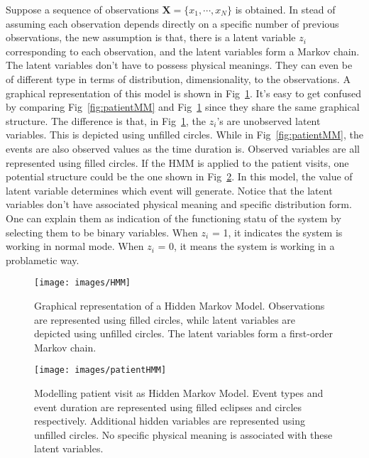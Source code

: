 Suppose a sequence of observations \(\mathbf{X} = \{x_1, \cdots, x_N\}\) is obtained. In stead of assuming each observation depends directly on a specific number of previous observations, the new assumption is that, there is a latent variable \(z_i\) corresponding to each observation, and the latent variables form a Markov chain. The latent variables don't have to possess physical meanings. They can even be of different type in terms of distribution, dimensionality, to the observations. A graphical representation of this model is shown in Fig~\ref{fig:HMM}. It's easy to get confused by comparing Fig~\ref{fig:patientMM} and Fig~\ref{fig:HMM} since they share the same graphical structure. The difference is that, in Fig~\ref{fig:HMM}, the \(z_i\)'s are unobserved latent variables. This is depicted using unfilled circles. While in Fig~\ref{fig:patientMM}, the events are also observed values as the time duration is. Observed variables are all represented using filled circles. If the HMM is applied to the patient visits, one potential structure could be the one shown in Fig~\ref{fig:patientHMM}. In this model, the value of latent variable determines which event will generate. Notice that the latent variables don't have associated physical meaning and specific distribution form. One can explain them as indication of the functioning statu of the system by selecting them to be binary variables. When \(z_i\) = 1, it indicates the system is working in normal mode. When \(z_i\) = 0, it means the system is working in a problametic way.

\begin{figure}[ht]
	\begin{center}
		\texttt{[image: images/HMM]}
		\caption{Graphical representation of a Hidden Markov Model. Observations are represented using filled circles, whilc latent variables are depicted using unfilled circles. The latent variables form a first-order Markov chain.}
		\label{fig:HMM}
	\end{center}
\end{figure}

\begin{figure}[ht]
	\begin{center}
		\texttt{[image: images/patientHMM]}
		\caption{Modelling patient visit as Hidden Markov Model. Event types and event duration are represented using filled eclipses and circles respectively. Additional hidden variables are represented using unfilled circles. No specific physical meaning is associated with these latent variables.}
		\label{fig:patientHMM}
	\end{center}
\end{figure}

